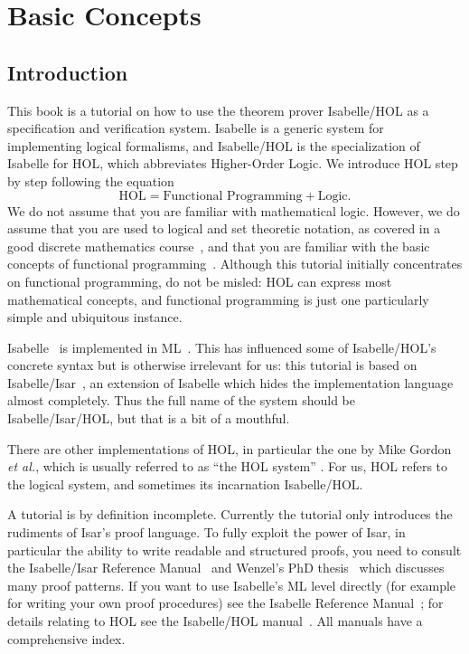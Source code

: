 \chapter{Basic Concepts}

\section{Introduction}

This book is a tutorial on how to use the theorem prover Isabelle/HOL as a
specification and verification system. Isabelle is a generic system for
implementing logical formalisms, and Isabelle/HOL is the specialization
of Isabelle for HOL, which abbreviates Higher-Order Logic. We introduce
HOL step by step following the equation
\[ \mbox{HOL} = \mbox{Functional Programming} + \mbox{Logic}. \]
We do not assume that you are familiar with mathematical logic. 
However, we do assume that
you are used to logical and set theoretic notation, as covered
in a good discrete mathematics course~\cite{Rosen-DMA}, and
that you are familiar with the basic concepts of functional
programming~\cite{Bird-Haskell,Hudak-Haskell,paulson-ml2,Thompson-Haskell}.
Although this tutorial initially concentrates on functional programming, do
not be misled: HOL can express most mathematical concepts, and functional
programming is just one particularly simple and ubiquitous instance.

Isabelle~\cite{paulson-isa-book} is implemented in ML~\cite{SML}.  This has
influenced some of Isabelle/HOL's concrete syntax but is otherwise irrelevant
for us: this tutorial is based on
Isabelle/Isar~\cite{isabelle-isar-ref}, an extension of Isabelle which hides
the implementation language almost completely.  Thus the full name of the
system should be Isabelle/Isar/HOL, but that is a bit of a mouthful.

There are other implementations of HOL, in particular the one by Mike Gordon
%
\emph{et al.}, which is usually referred to as ``the HOL system''
\cite{mgordon-hol}. For us, HOL refers to the logical system, and sometimes
its incarnation Isabelle/HOL\@.

A tutorial is by definition incomplete.  Currently the tutorial only
introduces the rudiments of Isar's proof language. To fully exploit the power
of Isar, in particular the ability to write readable and structured proofs,
you need to consult the Isabelle/Isar Reference
Manual~\cite{isabelle-isar-ref} and Wenzel's PhD thesis~\cite{Wenzel-PhD}
which discusses many proof patterns. If you want to use Isabelle's ML level
directly (for example for writing your own proof procedures) see the Isabelle
Reference Manual~\cite{isabelle-ref}; for details relating to HOL see the
Isabelle/HOL manual~\cite{isabelle-HOL}. All manuals have a comprehensive
index.

